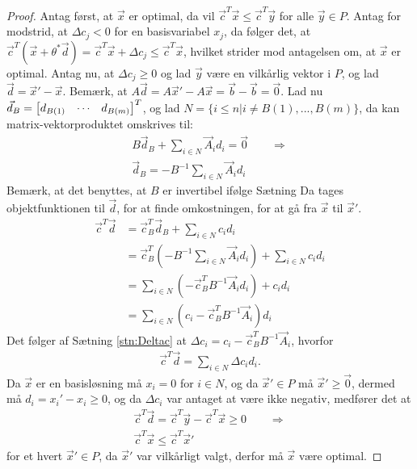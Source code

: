 \begin{proof}
Antag først, at $\vec{x}$ er optimal, da vil $\vec{c}^T\vec{x} \leq \vec{c}^T\vec{y}$ for alle $\vec{y} \in P$. 
Antag for modstrid, at $\Delta c_j < 0$ for en basisvariabel $x_j$, da følger det, at $\vec{c}^T(\vec{x}+\theta^*\vec{d}) = \vec{c}^T\vec{x} + \Delta c_j \leq \vec{c}^T\vec{x}$, hvilket strider mod antagelsen om, at $\vec{x}$ er optimal.
Antag nu, at $\Delta c_j \geq 0$ og lad $\vec{y}$ være en vilkårlig vektor i $P$, og lad $\vec{d}=\vec{x}'-\vec{x}$.
Bemærk, at $A\vec{d} = A\vec{x}'- A\vec{x} =  \vec{b} - \vec{b} =\vec{0}$.
Lad nu $\vec{d}_B = \begin{bmatrix} d_{B(1)} & \cdots & d_{B(m)} \end{bmatrix}^T$, og lad $N= \{i \leq n| i \neq B(1),...,B(m)\}$, da kan matrix-vektorproduktet omskrives til:
\begin{align*}
	B\vec{d}_B + \sum_{i \in N} \vec{A}_i d_i = \vec{0} \qquad \Rightarrow
	\\ \vec{d}_B = - B^{-1}\sum_{i \in N} \vec{A}_i d_i
\end{align*}
Bemærk, at det benyttes, at $B$ er invertibel ifølge Sætning %
Da tages objektfunktionen til $\vec{d}$, for at finde omkostningen, for at gå fra $\vec{x}$ til $\vec{x}'$.
\begin{align*}
 \vec{c}^T\vec{d} &= \vec{c}_B^T\vec{d}_B + \sum_{i \in N} c_i d_i 
 \\&= \vec{c}_B^T(- B^{-1}\sum_{i \in N} \vec{A}_i d_i) + \sum_{i \in N} c_i d_i  
 \\&= \sum_{i \in N} (- \vec{c}_B^T B^{-1} \vec{A}_i d_i) +  c_i d_i 
 \\&= \sum_{i \in N} ( c_i - \vec{c}_B^TB^{-1}\vec{A}_i ) d_i
\end{align*}
Det følger af Sætning \ref{stn:Deltac} at $\Delta c_i = c_i - \vec{c}_B^TB^{-1}\vec{A}_i $, hvorfor
\begin{align*}
\vec{c}^T\vec{d} = \sum_{i \in N} \Delta c_i d_i.
\end{align*}
Da $\vec{x}$ er en basisløsning må $x_i = 0$ for $i \in N$, og da $\vec{x}' \in P$ må $\vec{x}' \geq \vec{0}$, dermed må $d_i = x_i' - x_i \geq 0$, og da $\Delta c_i$ var antaget at være ikke negativ, medfører det at
\begin{align*}
\vec{c}^T\vec{d} = \vec{c}^T\vec{y}-\vec{c}^T\vec{x} \geq 0 \qquad \Rightarrow
\\ \vec{c}^T\vec{x} \leq \vec{c}^T\vec{x}'
\end{align*}
for et hvert $\vec{x}' \in P$, da $\vec{x}'$ var vilkårligt valgt, derfor må $\vec{x}$ være optimal.
\end{proof}

